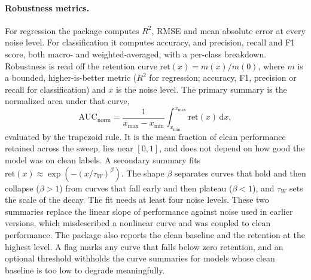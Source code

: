 \paragraph{Robustness metrics.} For regression the package computes $R^2$, RMSE and mean absolute
error at every noise level. For classification it computes accuracy, and precision, recall and F1
score, both macro- and weighted-averaged, with a per-class breakdown. Robustness is read off the
retention curve $\mathrm{ret}(x) = m(x)/m(0)$, where $m$ is a bounded, higher-is-better metric
($R^2$ for regression; accuracy, F1, precision or recall for classification) and $x$ is the noise
level. The primary summary is the normalized area under that curve,
\begin{equation}
\mathrm{AUC}_{\mathrm{norm}} = \frac{1}{x_{\max} - x_{\min}} \int_{x_{\min}}^{x_{\max}} \mathrm{ret}(x)\,\mathrm{d}x,
\label{eq:auc_norm}
\end{equation}
evaluated by the trapezoid rule. It is the mean fraction of clean performance retained across the
sweep, lies near $[0, 1]$, and does not depend on how good the model was on clean labels. A
secondary summary fits $\mathrm{ret}(x) \approx \exp\!\left(-(x/\tau_W)^{\beta}\right)$. The shape
$\beta$ separates curves that hold and then collapse ($\beta > 1$) from curves that fall early and
then plateau ($\beta < 1$), and $\tau_W$ sets the scale of the decay. The fit needs at least four
noise levels. These two summaries replace the linear slope of performance against noise used in
earlier versions, which misdescribed a nonlinear curve and was coupled to clean performance. The
package also reports the clean baseline and the retention at the highest level. A flag marks any
curve that falls below zero retention, and an optional threshold withholds the curve summaries for
models whose clean baseline is too low to degrade meaningfully.

